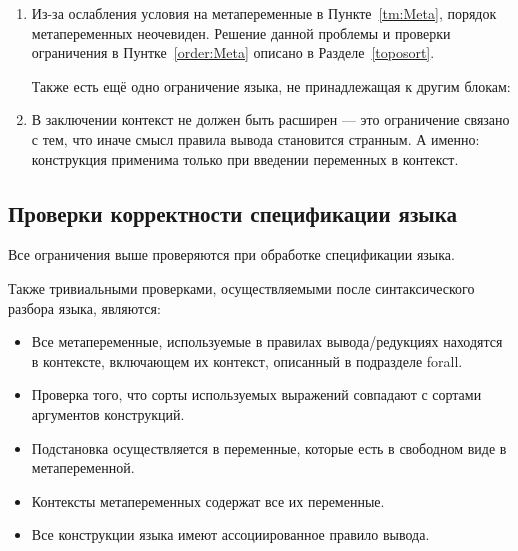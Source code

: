 \begin{enumerate}
\item Из-за ослабления условия на метапеременные в Пункте~\ref{tm:Meta}, порядок метапеременных неочевиден. Решение данной проблемы и проверки ограничения в Пунтке~\ref{order:Meta} описано в Разделе~\ref{toposort}.

\hfill

Также есть ещё одно ограничение языка, не принадлежащая к другим блокам:
\item В заключении контекст не должен быть расширен --- это ограничение связано с тем, что иначе смысл правила вывода становится странным. А именно: конструкция применима только при введении переменных в контекст.
\end{enumerate}



\subsection{Проверки корректности спецификации языка}

Все ограничения выше проверяются при обработке спецификации языка.

Также тривиальными проверками, осуществляемыми после синтаксического разбора языка, являются:
\begin{itemize}
\item Все метапеременные, используемые в правилах вывода/редукциях находятся в контексте, включающем их контекст, описанный в подразделе forall.
\item Проверка того, что сорты используемых выражений совпадают с сортами аргументов конструкций.
\item Подстановка осуществляется в переменные, которые есть в свободном виде в метапеременной.
\item Контексты метапеременных содержат все их переменные.
\item Все конструкции языка имеют ассоциированное правило вывода.
\end{itemize}
